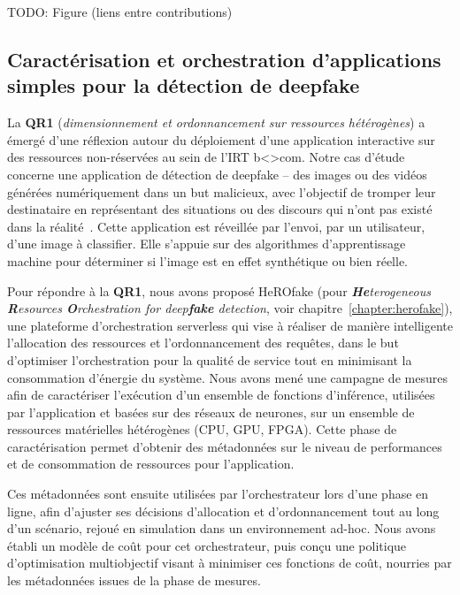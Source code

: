 TODO: Figure (liens entre contributions)

\subsection{Caractérisation et orchestration d'applications simples pour la détection de deepfake}

La \textbf{QR1} (\textit{dimensionnement et ordonnancement sur ressources hétérogènes}) a émergé d'une réflexion autour du déploiement d'une application interactive sur des ressources non-réservées au sein de l'IRT b{\textless\textgreater}com. Notre cas d'étude concerne une application de détection de deepfake -- des images ou des vidéos générées numériquement dans un but malicieux, avec l'objectif de tromper leur destinataire en représentant des situations ou des discours qui n'ont pas existé dans la réalité~\cite{westerlundEmergenceDeepfakeTechnology2019}. Cette application est réveillée par l'envoi, par un utilisateur, d'une image à classifier. Elle s'appuie sur des algorithmes d'apprentissage machine pour déterminer si l'image est en effet synthétique ou bien réelle.

Pour répondre à la \textbf{QR1}, nous avons proposé HeROfake (pour \textit{\textbf{He}terogeneous \textbf{R}esources \textbf{O}rchestration for deep\textbf{fake} detection}, voir chapitre~\ref{chapter:herofake}), une plateforme d'orchestration serverless qui vise à réaliser de manière intelligente l'allocation des ressources et l'ordonnancement des requêtes, dans le but d'optimiser l'orchestration pour la qualité de service tout en minimisant la consommation d'énergie du système. Nous avons mené une campagne de mesures afin de caractériser l'exécution d'un ensemble de fonctions d'inférence, utilisées par l'application et basées sur des réseaux de neurones, sur un ensemble de ressources matérielles hétérogènes (CPU, GPU, FPGA). Cette phase de caractérisation permet d'obtenir des métadonnées sur le niveau de performances et de consommation de ressources pour l'application.

Ces métadonnées sont ensuite utilisées par l'orchestrateur lors d'une phase en ligne, afin d'ajuster ses décisions d'allocation et d'ordonnancement tout au long d'un scénario, rejoué en simulation dans un environnement ad-hoc. Nous avons établi un modèle de coût pour cet orchestrateur, puis conçu une politique d'optimisation multiobjectif visant à minimiser ces fonctions de coût, nourries par les métadonnées issues de la phase de mesures.

